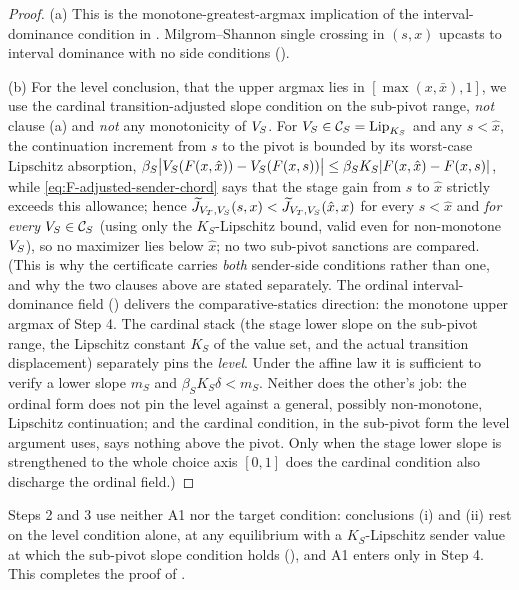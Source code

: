 \begin{proof}
(a) This is the monotone-greatest-argmax implication of the
interval-dominance condition in . Milgrom--Shannon
single crossing in $(s,x)$ upcasts to interval dominance with no side
conditions ().

(b) For the level
conclusion, that the upper argmax lies in $[\max(x,\bar x),1]$,
we use the cardinal transition-adjusted slope condition on the sub-pivot range,
\emph{not} clause (a) and \emph{not} any monotonicity
of $V_S$. For $V_S\in\mathcal C_S=\mathrm{Lip}_{K_S}$ and any
$s<\hat x$, the continuation increment from $s$ to the pivot is
bounded by its worst-case Lipschitz absorption,
$\beta_S\bigl|V_S(F(x,\hat x))-V_S(F(x,s))\bigr|\le\beta_S
K_S|F(x,\hat x)-F(x,s)|$, while
\eqref{eq:F-adjusted-sender-chord} says that the stage gain from $s$ to
$\hat x$ strictly exceeds this allowance; hence
$\widetilde J_{V_T,V_S}(s,x)<\widetilde J_{V_T,V_S}(\hat x,x)$ for every
$s<\hat x$ and \emph{for every} $V_S\in\mathcal C_S$ (using only the
$K_S$-Lipschitz bound, valid even for non-monotone $V_S$), so no
maximizer lies below $\hat x$; no two sub-pivot sanctions are compared.
(This is why the certificate carries \emph{both}
sender-side conditions rather than one, and why the two clauses above
are stated separately. The ordinal interval-dominance field
() delivers the
comparative-statics direction: the monotone upper argmax of Step 4.
The cardinal
stack (the stage lower slope on the sub-pivot range, the Lipschitz
constant $K_S$ of the value set, and the actual transition displacement)
separately pins the \emph{level}. Under the affine law it is sufficient
to verify a lower slope $m_S$ and $\beta_S K_S\delta<m_S$. Neither does the
other's job: the ordinal form does not pin the level against a
general, possibly non-monotone, Lipschitz continuation; and the cardinal condition,
in the sub-pivot form the level argument uses, says nothing above the
pivot. Only when the stage lower slope is strengthened to the whole
choice axis $[0,1]$ does the cardinal condition
also discharge the ordinal field.)
\end{proof}

Steps 2 and 3 use neither A1 nor the target condition: conclusions (i) and (ii)
rest on the level condition alone, at any equilibrium with a $K_S$-Lipschitz
sender value at which the sub-pivot slope condition holds
(), and A1 enters only
in Step 4. This completes the proof of .

